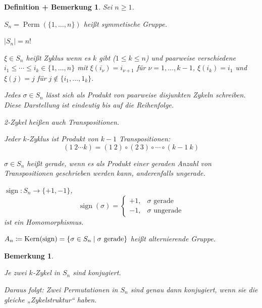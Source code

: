 \documentclass[a4paper,10pt,german]{scrbook}
\newcommand{\da}{\coloneqq}
\theoremstyle{saetze}
\theoremstyle{definitionen}
\newtheorem{DefBem}[Def]{Definition + Bemerkung}
\newtheorem{Bem}[Def]{Bemerkung}
\begin{document}
\begin{DefBem}
Sei $n\ge 1$.
\begin{enum}
\item $S_n = \operatorname{Perm}(\{1,\ldots,n\})$ heißt \textit{symmetische Gruppe}.
\item $|S_n| = n!$
\item $\xi \in S_n$ heißt Zyklus wenn es $k$ gibt ($1\le k\le n$) und paarweise verschiedene $i_1\le\cdots\le i_k \in\{1,\ldots,n\}$ mit $\xi(i_\nu) = i_{\nu+1}$ für $\nu=1,\ldots,k-1$, $\xi(i_k) = i_1$ und $\xi(j)=j$ für $j\notin \{i_1,\ldots,1_k\}$.
\item Jedes $\sigma\in S_n$ lässt sich als Produkt von paarweise disjunkten Zykeln schreiben. Diese Darstellung ist eindeutig bis auf die Reihenfolge.
\item 2-Zykel heißen auch Transpositionen.
\item Jeder $k$-Zyklus ist Produkt von $k-1$ Transpositionen:
\[
(1\ 2 \cdots k) = (1\ 2)\circ(2\ 3)\circ\cdots\circ(k-1\ k)
\]
\item $\sigma \in S_n$ heißt \textit{gerade}, wenn es als Produkt einer geraden Anzahl von Transpositionen geschrieben werden kann, anderenfalls \textit{ungerade}.
\item $\operatorname{sign} : S_n \to \{+1,-1\}$,\[\operatorname{sign}(\sigma) = \begin{cases}+1, &\sigma\text{ gerade}\\-1,&\sigma\text{ ungerade}\end{cases}\] ist ein Homomorphismus.

$A_n\da \Kern(\operatorname{sign}) = \{\sigma \in S_n\mid \sigma \text{ gerade}\}$ heißt \textit{alternierende Gruppe}.
\end{enum}
\end{DefBem}

\begin{Bem}
\begin{enum}
\item
Je zwei $k$-Zykel in $S_n$ sind konjugiert.
\item Daraus folgt: Zwei Permutationen in $S_n$ sind genau dann konjugiert, wenn sie die gleiche „Zykelstruktur“ haben.
\end{enum}
\end{Bem}
\end{document}
